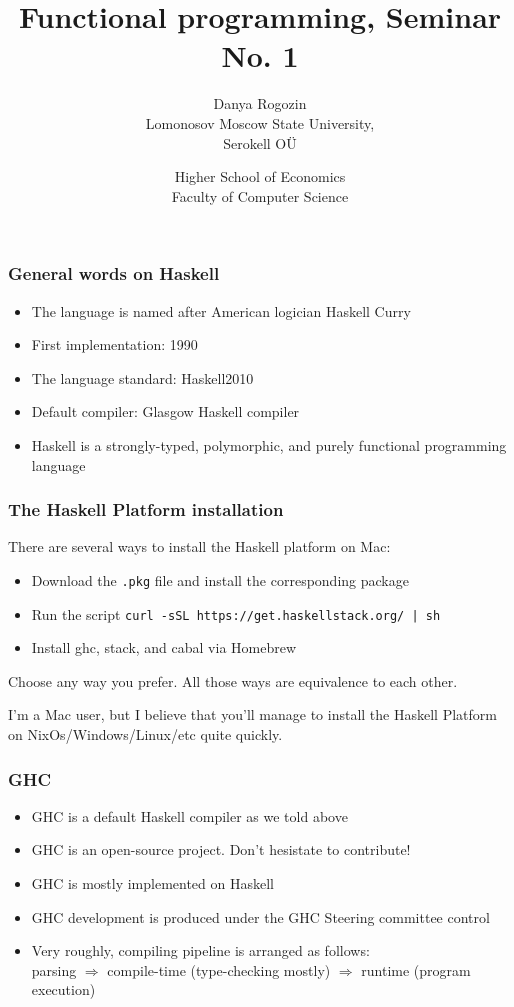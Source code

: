 \documentclass[10pt,pdf,utf8,russian,aspectratio=169]{beamer}
\title{Functional programming, Seminar No. 1}
\author{Danya Rogozin \\ Lomonosov Moscow State University, \\ Serokell O\"{U}}
\date{Higher School of Economics \\ Faculty of Computer Science}
\begin{document}
\maketitle

\begin{frame}
  \frametitle{General words on Haskell}

  \begin{itemize}
    \item The language is named after American logician Haskell Curry
    \item First implementation: 1990
    \item The language standard: Haskell2010
    \item Default compiler: Glasgow Haskell compiler
    \item Haskell is a strongly-typed, polymorphic, and purely functional programming language
  \end{itemize}
\end{frame}

\begin{frame}
  \frametitle{The Haskell Platform installation}

  There are several ways to install the Haskell platform on Mac:

  \begin{itemize}
    \item Download the \verb".pkg" file and install the corresponding package
    \item Run the script \verb"curl -sSL https://get.haskellstack.org/ | sh"
    \item Install ghc, stack, and cabal via Homebrew
  \end{itemize}

  Choose any way you prefer. All those ways are equivalence to each other.

  \vspace{\baselineskip}

 I'm a Mac user, but I believe that you'll manage to install the Haskell Platform on NixOs/Windows/Linux/etc quite quickly.
\end{frame}

\begin{frame}
  \frametitle{GHC}

  \begin{itemize}
    \item GHC is a default Haskell compiler as we told above
    \item GHC is an open-source project. Don't hesistate to contribute!
    \item GHC is mostly implemented on Haskell
    \item GHC development is produced under the GHC Steering committee control
    \item Very roughly, compiling pipeline is arranged as follows: \\ parsing $\Rightarrow$ compile-time (type-checking mostly)
    $\Rightarrow$ runtime (program execution)
  \end{itemize}
\end{frame}
\end{document}
